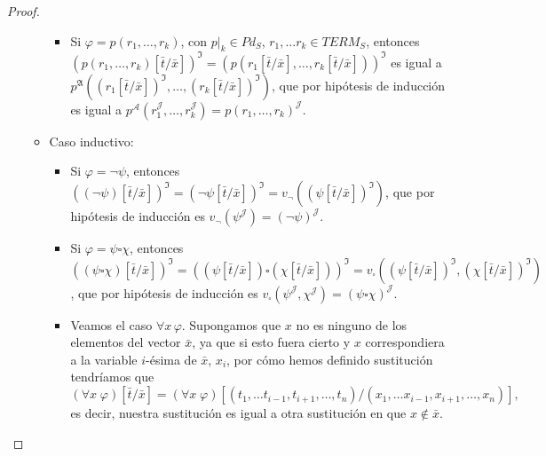 \begin{proof}
\begin{enumerate}
\begin{itemize}
\begin{itemize}
                    \item Si $\varphi = p(r_1, \dots, r_k)$, con $p|_k \in Pd_S$, $r_1, \dots r_k \in TERM_S$, entonces $(p(r_1, \dots, r_k)[\bar{t}/\bar{x}])^{\mathfrak{I}} = (p(r_1[\bar{t}/\bar{x}], \dots, r_k[\bar{t}/\bar{x}]))^{\mathfrak{I}}$ es igual a  $p^{\mathfrak{A}}((r_1[\bar{t}/\bar{x}])^{\mathfrak{I}}, \dots, (r_k[\bar{t}/\bar{x}])^{\mathfrak{I}})$, que por hipótesis de inducción es igual a $p^{\mathcal{A}}(r_1^{\mathcal{J}}, \dots, r_k^{\mathcal{J}}) = p(r_1, \dots, r_k)^{\mathcal{J}}$.
                \end{itemize}
            \item Caso inductivo:
                    \begin{itemize}
                        \item Si $\varphi = \neg \psi$, entonces $((\neg \psi)[\bar{t}/\bar{x}])^{\mathfrak{I}} = (\neg \psi[\bar{t}/\bar{x}])^{\mathfrak{I}} = v_{\neg}((\psi[\bar{t}/\bar{x}])^{\mathfrak{I}})$, que por hipótesis de inducción es $v_{\neg}(\psi^{\mathcal{J}}) = (\neg \psi)^{\mathcal{J}}$.
                        \item Si $\varphi = \psi \square \chi$, entonces $((\psi \square \chi)[\bar{t}/\bar{x}])^{\mathfrak{I}} = ((\psi[\bar{t}/\bar{x}]) \square (\chi[\bar{t}/\bar{x}]))^{\mathfrak{I}} = v_{\square}((\psi[\bar{t}/\bar{x}])^{\mathfrak{I}}, (\chi[\bar{t}/\bar{x}])^{\mathfrak{I}})$, que por hipótesis de inducción es $v_{\square}(\psi^{\mathcal{J}}, \chi^{\mathcal{J}}) = (\psi \square \chi)^{\mathcal{J}}$.
                        \item Veamos el caso $\forall x \, \varphi$. Supongamos que $x$ no es ninguno de los elementos del vector $\bar{x}$, ya que si esto fuera cierto y $x$ correspondiera a la variable $i$-ésima de $\bar{x}$, $x_i$, por cómo hemos definido sustitución tendríamos que 
                        $$(\forall x\;\varphi)[\bar{t}/\bar{x}]=(\forall x\;\varphi)[(t_1,\dots t_{i-1},t_{i+1},\dots,t_n)/(x_1,\dots x_{i-1},x_{i+1},\dots,x_n)],$$
                        es decir, nuestra sustitución es igual a otra sustitución en que $x\notin\bar{x}$.
    

\end{itemize}
\end{itemize}
\end{enumerate}
\end{proof}
